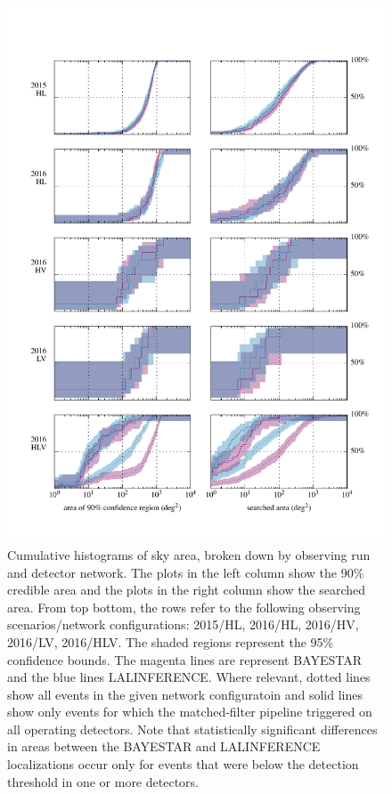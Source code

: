 \documentclass[amsmath,amssymb,aps,prx,reprint,nopreprintnumbers,nofootinbib,showpacs]{revtex4-1}
\begin{document}
\begin{figure}
    \includegraphics{area-hist}
    \caption{\label{fig:area-hist}Cumulative histograms of sky area, broken down by observing run and detector network. The plots in the left column show the 90\% credible area and the plots in the right column show the searched area. From top bottom, the rows refer to the following observing scenarios/network configurations: 2015/HL, 2016/HL, 2016/HV, 2016/LV, 2016/HLV. The shaded regions represent the 95\% confidence bounds. The magenta lines are represent \ac{BAYESTAR} and the blue lines LALINFERENCE. Where relevant, dotted lines show all events in the given network configuratoin and solid lines show only events for which the matched\nobreakdashes-filter pipeline triggered on all operating detectors. Note that statistically significant differences in areas between the \ac{BAYESTAR} and LALINFERENCE localizations occur only for events that were below the detection threshold in one or more detectors.}
\end{figure}
\end{document}
